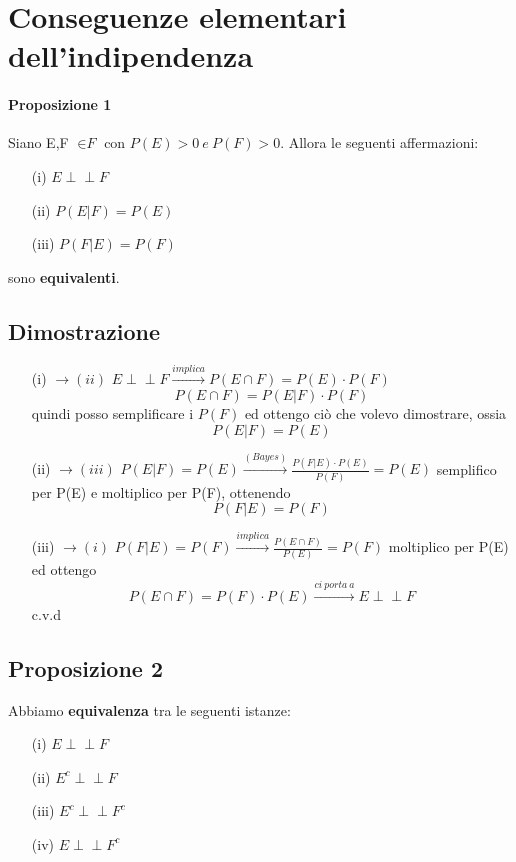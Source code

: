 \documentclass{report}
\newcommand{\indep}{\perp \!\!\! \perp}
\begin{document}
\section{Conseguenze elementari dell'indipendenza}
\paragraph{Proposizione 1}Siano E,F \(\in \textit{F}\) con \(P(E) > 0\ e\ P(F) > 0\). Allora le seguenti affermazioni:
    \begin{itemize}
        \item [(i)] \(E \indep F\)
        \item [(ii)] \(P(E|F) = P(E)\)
        \item [(iii)] \(P(F|E) = P(F)\)
    \end{itemize}
    sono \textbf{equivalenti}.
\subsection{Dimostrazione} \begin{itemize}
    \item [(i) \(\xrightarrow{} (ii)\)] \(E \indep F \xrightarrow{implica} P(E \cap F) = P(E)\cdot P(F)\) \[P(E \cap F) = P(E|F) \cdot P(F)\] quindi posso semplificare i \(P(F)\) ed ottengo ciò che volevo dimostrare, ossia \[P(E|F) = P(E)\]
    \item [(ii) \(\xrightarrow{} (iii)\)] \(P(E|F) = P(E) \xrightarrow{(Bayes)} \frac{P(F|E)\cdot P(E)}{P(F)} = P(E)\) semplifico per P(E) e moltiplico per P(F), ottenendo \[P(F|E) = P(F)\]
    \item [(iii) \(\xrightarrow{} (i)\)] \(P(F|E) = P(F) \xrightarrow{implica} \frac{P(E \cap F)}{P(E)} = P(F)\) moltiplico per P(E) ed ottengo \[P(E \cap F) = P(F) \cdot P(E) \xrightarrow{ci\ porta\ a} E \indep F\] c.v.d
\end{itemize}
\subsection{Proposizione 2} Abbiamo \textbf{equivalenza} tra le seguenti istanze:
\begin{itemize}
    \item [(i)] \(E \indep F\)
    \item [(ii)] \(E^c \indep F\)
    \item [(iii)] \(E^c \indep F^c\)
    \item [(iv)] \(E \indep F^c\)
\end{itemize}
\end{document}

